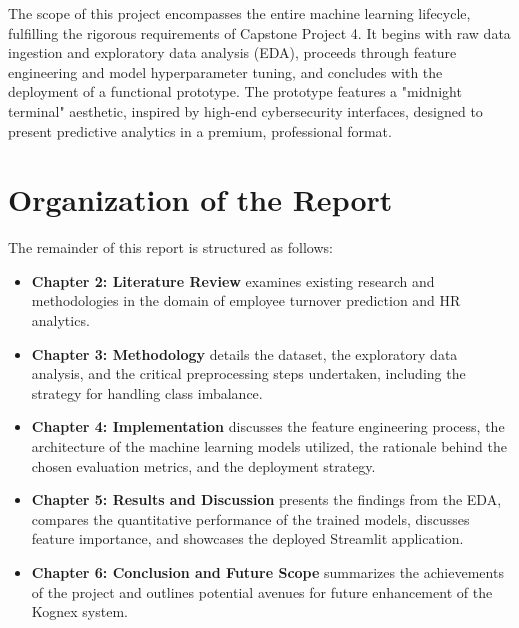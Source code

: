The scope of this project encompasses the entire machine learning lifecycle, fulfilling the rigorous requirements of Capstone Project 4. It begins with raw data ingestion and exploratory data analysis (EDA), proceeds through feature engineering and model hyperparameter tuning, and concludes with the deployment of a functional prototype. The prototype features a "midnight terminal" aesthetic, inspired by high-end cybersecurity interfaces, designed to present predictive analytics in a premium, professional format.

\section{Organization of the Report}
The remainder of this report is structured as follows:
\begin{itemize}
    \item \textbf{Chapter 2: Literature Review} examines existing research and methodologies in the domain of employee turnover prediction and HR analytics.
    \item \textbf{Chapter 3: Methodology} details the dataset, the exploratory data analysis, and the critical preprocessing steps undertaken, including the strategy for handling class imbalance.
    \item \textbf{Chapter 4: Implementation} discusses the feature engineering process, the architecture of the machine learning models utilized, the rationale behind the chosen evaluation metrics, and the deployment strategy.
    \item \textbf{Chapter 5: Results and Discussion} presents the findings from the EDA, compares the quantitative performance of the trained models, discusses feature importance, and showcases the deployed Streamlit application.
    \item \textbf{Chapter 6: Conclusion and Future Scope} summarizes the achievements of the project and outlines potential avenues for future enhancement of the Kognex system.
\end{itemize}
